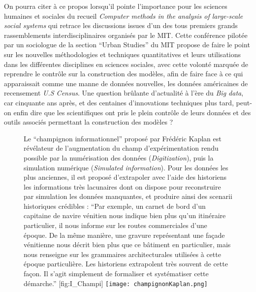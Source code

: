 On pourra citer à ce propos \textcite{Gullahorn1966} lorsqu'il pointe l'importance pour les sciences humaines et sociales du recueil \textit{Computer methods in the analysis of large-scale social systems} qui retrace les discussions issues d'un des tous premiers grands rassemblements interdisciplinaires organisés par le MIT. Cette conférence pilotée par un sociologue de la section \foreignquote{english}{Urban Studies} du MIT \autocite{Beshers1965} propose de faire le point sur les nouvelles méthodologies et techniques quantitatives et leurs utilisations dans les différentes disciplines en sciences sociales, avec cette volonté marquée de reprendre le contrôle sur la construction des modèles, afin de faire face à ce qui apparaissait comme une manne de données nouvelles, les données américaines de recensement \textit{U.S Census}. Une question brûlante d'actualité à l'ère du \textit{Big data}, car cinquante ans après, et des centaines d'innovations techniques plus tard, peut-on enfin dire que les scientifiques ont pris le plein contrôle de leurs données et des outils associés permettant la construction des modèles ?

\begin{figure}[!htbp]
\begin{sidecaption}[fortoc]{Le \enquote{champignon informationnel} proposé par Frédéric Kaplan est révélateur de l'augmentation du champ d'expérimentation rendu possible par la numérisation des données (\textit{Digitization}), puis la simulation numérique (\textit{Simulated information}). Pour les données les plus anciennes, il est proposé d'extrapoler avec l'aide des historiens les informations très lacunaires dont on dispose pour reconstruire par simulation les données manquantes, et produire ainsi des scenarii historiques crédibles : \enquote{Par exemple, un carnet de bord d’un capitaine de navire vénitien nous indique bien plus qu’un itinéraire particulier, il nous informe sur les routes commerciales d’une époque. De la même manière, une gravure représentant une façade vénitienne nous décrit bien plus que ce bâtiment en particulier, mais nous renseigne sur les grammaires architecturales utilisées à cette époque particulière. Les historiens extrapolent très souvent de cette façon. Il s’agit simplement de formaliser et systématiser cette démarche.} }[fig:I_Champi]
 \centering
 \texttt{[image: champignonKaplan.png]}
  \end{sidecaption}
\end{figure}


